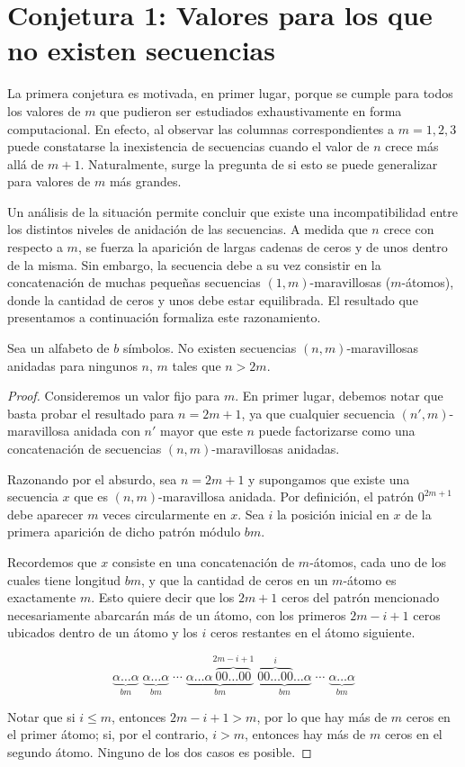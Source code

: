 \section{Conjetura 1: Valores para los que no existen secuencias}

La primera conjetura es motivada, en primer lugar, porque se cumple para todos
los valores de $m$ que pudieron ser estudiados exhaustivamente en forma
computacional.
En efecto, al observar las columnas correspondientes a $m = 1, 2, 3$ puede
constatarse la inexistencia de secuencias cuando el valor de $n$ crece
más allá de $m + 1$. Naturalmente, surge la pregunta de si esto se puede
generalizar para valores de $m$ más grandes.

Un análisis de la situación permite concluir que existe una
incompatibilidad entre los distintos niveles de anidación de las secuencias.
A medida que $n$ crece con respecto a $m$, se fuerza la aparición de largas
cadenas de ceros y de unos dentro de la misma. Sin embargo, la secuencia debe
a su vez consistir en la concatenación de muchas pequeñas secuencias
$(1,m)$-maravillosas ($m$-átomos), donde la cantidad de ceros y unos debe estar
equilibrada.
El resultado que presentamos a continuación formaliza este razonamiento.

\begin{theorem}
	Sea un alfabeto de $b$ símbolos.
	No existen secuencias $(n,m)$-maravillosas anidadas para ningunos $n$, $m$
	tales que $n > 2m$.
\end{theorem}

\begin{proof}
	Consideremos un valor fijo para $m$.
	En primer lugar, debemos notar que basta probar el resultado para $n = 2m +
		1$, ya que cualquier secuencia $(n',m)$-maravillosa anidada con $n'$ mayor
		que este $n$ puede factorizarse como una concatenación de secuencias
	$(n,m)$-maravillosas anidadas.

		Razonando por el absurdo, sea $n = 2m + 1$ y supongamos que existe una
	secuencia $x$ que es $(n,m)$-maravillosa anidada.
	Por definición, el patrón $0^{2m+1}$ debe aparecer $m$ veces circularmente
	en $x$. Sea $i$ la posición inicial en $x$ de la primera aparición de dicho
	patrón módulo $bm$.

	Recordemos que $x$ consiste en una concatenación de $m$-átomos, cada uno de
	los cuales tiene longitud $bm$, y que la cantidad de ceros en un $m$-átomo
	es exactamente $m$. Esto quiere decir que los $2m+1$ ceros del patrón mencionado
	necesariamente abarcarán más de un átomo, con los primeros $2m - i + 1$ ceros
	ubicados dentro de un átomo y los $i$ ceros restantes en el átomo
	siguiente.

	\[ \underbrace{\alpha\dots\alpha}_{bm}
		\; \underbrace{\alpha\dots\alpha}_{bm} \; \cdots
		\; \underbrace{\alpha\dots\alpha\overbrace{00\dots00}^{2m-i+1}}_{bm}
		\; \underbrace{\overbrace{00\dots00}^{i}\dots\alpha}_{bm} \; \cdots
		\; \underbrace{\alpha\dots\alpha}_{bm} \]

	Notar que si $i \leq m$, entonces $2m - i + 1 > m$, por lo que hay
	más de $m$ ceros en el primer átomo; si, por el contrario, $i > m$, entonces
	hay más de $m$ ceros en el segundo átomo. Ninguno de los dos casos es posible.
\end{proof}

